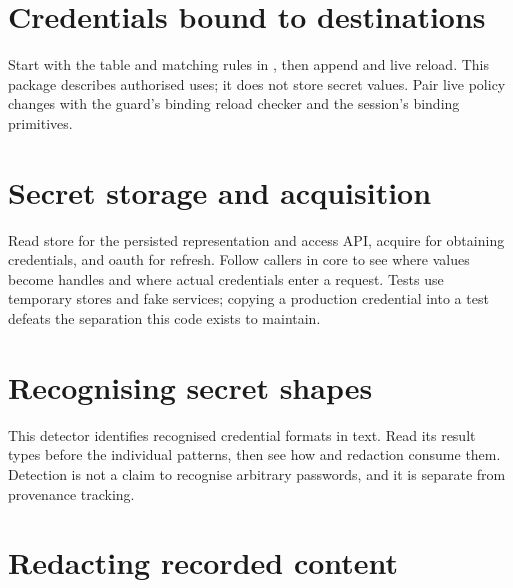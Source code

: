 \chapter{Credentials bound to destinations}

Start with the table and matching rules in , then append and live reload. This package describes authorised uses; it does not store secret values. Pair live policy changes with the guard's binding reload checker and the session's binding primitives.




\chapter{Secret storage and acquisition}

Read store for the persisted representation and access API, acquire for obtaining credentials, and oauth for refresh. Follow callers in core to see where values become handles and where actual credentials enter a request. Tests use temporary stores and fake services; copying a production credential into a test defeats the separation this code exists to maintain.






\chapter{Recognising secret shapes}

This detector identifies recognised credential formats in text. Read its result types before the individual patterns, then see how  and redaction consume them. Detection is not a claim to recognise arbitrary passwords, and it is separate from provenance tracking.


\chapter{Redacting recorded content}

